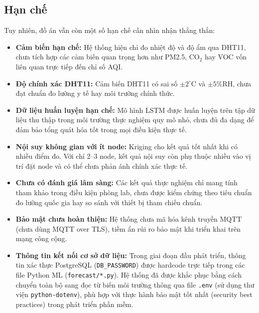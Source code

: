 \subsection{Hạn chế}
\label{subsec:conclusion:limit}

Tuy nhiên, đồ án vẫn còn một số hạn chế cần nhìn nhận thẳng thắn:

\begin{itemize}[leftmargin=2cm]
  \item \textbf{Cảm biến hạn chế:} Hệ thống hiện chỉ đo nhiệt độ
    và độ ẩm qua DHT11, chưa tích hợp các cảm biến quan trọng hơn
    như PM2.5, CO$_2$ hay VOC vốn liên quan trực tiếp đến chỉ số
    AQI.

  \item \textbf{Độ chính xác DHT11:} Cảm biến DHT11 có sai số
    $\pm 2^\circ$C và $\pm 5\%$RH, chưa đạt chuẩn đo lường y tế
    hay môi trường chính thức.

  \item \textbf{Dữ liệu huấn luyện hạn chế:} Mô hình LSTM được
    huấn luyện trên tập dữ liệu thu thập trong môi trường thực
    nghiệm quy mô nhỏ, chưa đủ đa dạng để đảm bảo tổng quát hóa
    tốt trong mọi điều kiện thực tế.

  \item \textbf{Nội suy không gian với ít node:} Kriging cho kết
    quả tốt nhất khi có nhiều điểm đo. Với chỉ 2--3 node, kết quả
    nội suy còn phụ thuộc nhiều vào vị trí đặt node và có thể chưa
    phản ánh chính xác thực tế.

  \item \textbf{Chưa có đánh giá lâm sàng:} Các kết quả thực
    nghiệm chỉ mang tính tham khảo trong điều kiện phòng lab,
    chưa được kiểm chứng theo tiêu chuẩn đo lường quốc gia hay
    so sánh với thiết bị tham chiếu chuẩn.

  \item \textbf{Bảo mật chưa hoàn thiện:} Hệ thống chưa mã hóa
    kênh truyền MQTT (chưa dùng MQTT over TLS), tiềm ẩn rủi ro
    bảo mật khi triển khai trên mạng công cộng.

  \item \textbf{Thông tin kết nối cơ sở dữ liệu:} Trong giai đoạn
    đầu phát triển, thông tin xác thực PostgreSQL
    (\texttt{DB\_PASSWORD}) được hardcode trực tiếp trong các file
    Python ML (\texttt{forecast/*.py}). Hệ thống đã được khắc phục
    bằng cách chuyển toàn bộ sang đọc từ biến môi trường thông qua
    file \texttt{.env} (sử dụng thư viện \texttt{python-dotenv}),
    phù hợp với thực hành bảo mật tốt nhất (security best
    practices) trong phát triển phần mềm.
\end{itemize}

